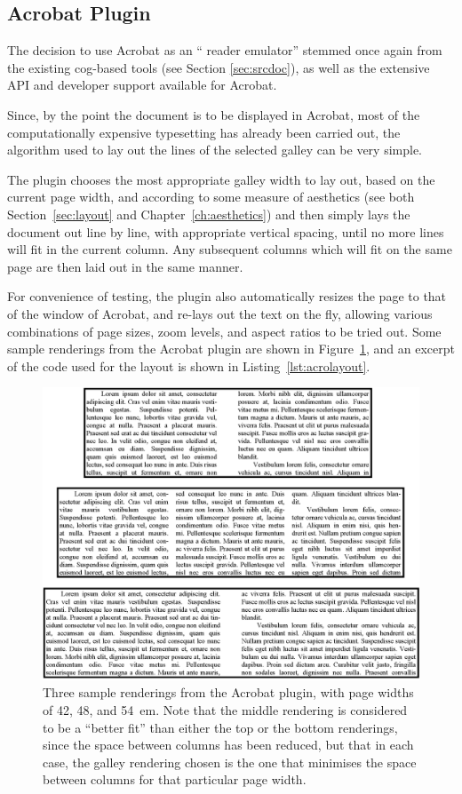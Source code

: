 \subsection{Acrobat Plugin}\label{sec:acroplugin}

The decision to use Acrobat as an ``\ebook{} reader emulator'' stemmed once again from the existing \gls{cog}-based tools (see Section \ref{sec:srcdoc}), as well as the extensive API and developer support available for Acrobat.

Since, by the point the document is to be displayed in Acrobat, most of the computationally expensive typesetting has already been carried out, the algorithm used to lay out the lines of the selected galley can be very simple.

The plugin chooses the most appropriate galley width to lay out, based on the current page width, and according to some measure of aesthetics (see both Section~\ref{sec:layout} and Chapter~\ref{ch:aesthetics}) and then simply lays the document out line by line, with appropriate vertical spacing, until no more lines will fit in the current column. Any subsequent columns which will fit on the same page are then laid out in the same manner.

For convenience of testing, the plugin also automatically resizes the page to that of the window of Acrobat, and re-lays out the text on the fly, allowing various combinations of page sizes, zoom levels, and aspect ratios to be tried out.
Some sample renderings from the Acrobat plugin are shown in Figure~\ref{fig:renderings}, and an excerpt of the code used for the layout is shown in Listing~\ref{lst:acrolayout}.

\begin{figure}
 \includegraphics[width=\textwidth]{gfx/renderings-bbox}
 \caption[Sample renderings from the Acrobat plugin]{Three sample renderings from the Acrobat plugin, with page widths of 42, 48, and 54~em. Note that the middle rendering is considered to be a ``better fit'' than either the top or the bottom renderings, since the space between columns has been reduced, but that in each case, the galley rendering chosen is the one that minimises the space between columns for that particular page width.}
 \label{fig:renderings}
\end{figure}


